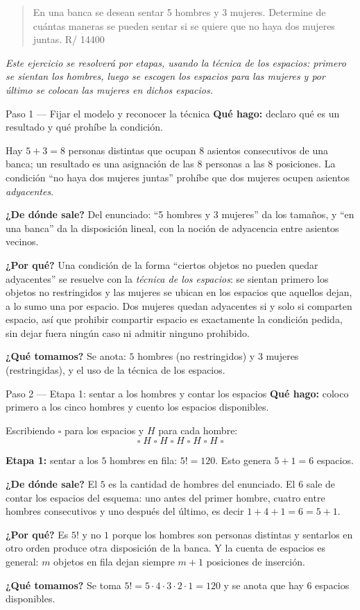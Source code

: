 \documentclass[11pt]{article}
\begin{document}
\begin{quote}
En una banca se desean sentar 5 hombres y 3 mujeres. Determine de cuántas maneras se pueden sentar si se quiere que no haya dos mujeres juntas. \hfill R/ 14400
\end{quote}

\emph{Este ejercicio se resolverá por etapas, usando la técnica de los espacios: primero se sientan los hombres, luego se escogen los espacios para las mujeres y por último se colocan las mujeres en dichos espacios.}

\begin{paso}{Paso 1 --- Fijar el modelo y reconocer la técnica}
\textbf{Qué hago:} declaro qué es un resultado y qué prohíbe la condición.

Hay $5+3=8$ personas distintas que ocupan $8$ asientos consecutivos de una banca; un resultado es una asignación de las $8$ personas a las $8$ posiciones. La condición ``no haya dos mujeres juntas'' prohíbe que dos mujeres ocupen asientos \emph{adyacentes}.

\textbf{¿De dónde sale?} Del enunciado: ``5 hombres y 3 mujeres'' da los tamaños, y ``en una banca'' da la disposición lineal, con la noción de adyacencia entre asientos vecinos.

\textbf{¿Por qué?} Una condición de la forma ``ciertos objetos no pueden quedar adyacentes'' se resuelve con la \emph{técnica de los espacios}: se sientan primero los objetos no restringidos y las mujeres se ubican en los espacios que aquellos dejan, a lo sumo una por espacio. Dos mujeres quedan adyacentes si y solo si comparten espacio, así que prohibir compartir espacio es exactamente la condición pedida, sin dejar fuera ningún caso ni admitir ninguno prohibido.

\textbf{¿Qué tomamos?} Se anota: $5$ hombres (no restringidos) y $3$ mujeres (restringidas), y el uso de la técnica de los espacios.
\end{paso}

\begin{paso}{Paso 2 --- Etapa 1: sentar a los hombres y contar los espacios}
\textbf{Qué hago:} coloco primero a los cinco hombres y cuento los espacios disponibles.

Escribiendo $\square$ para los espacios y $H$ para cada hombre:
\[
  \square\; H \;\square\; H \;\square\; H \;\square\; H \;\square\; H \;\square
\]

\medskip
\textbf{Etapa 1:} sentar a los $5$ hombres en fila: $5!=120$. Esto genera $5+1=6$ espacios.

\textbf{¿De dónde sale?} El $5$ es la cantidad de hombres del enunciado. El $6$ sale de contar los espacios del esquema: uno antes del primer hombre, cuatro entre hombres consecutivos y uno después del último, es decir $1+4+1=6=5+1$.

\textbf{¿Por qué?} Es $5!$ y no $1$ porque los hombres son personas distintas y sentarlos en otro orden produce otra disposición de la banca. Y la cuenta de espacios es general: $m$ objetos en fila dejan siempre $m+1$ posiciones de inserción.

\textbf{¿Qué tomamos?} Se toma $5!=5\cdot 4\cdot 3\cdot 2\cdot 1 = 120$ y se anota que hay $6$ espacios disponibles.
\end{paso}
\end{document}
